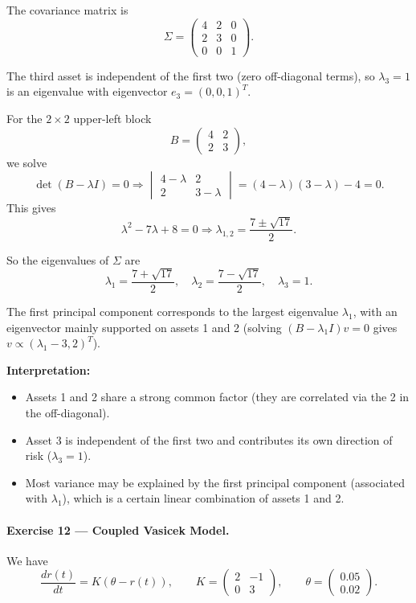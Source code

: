 \documentclass[11pt]{article}
\begin{document}
The covariance matrix is
\[
\Sigma=
\begin{pmatrix}
4 & 2 & 0\\
2 & 3 & 0\\
0 & 0 & 1
\end{pmatrix}.
\]

The third asset is independent of the first two (zero off-diagonal terms), so $\lambda_3=1$ is an eigenvalue with eigenvector $e_3=(0,0,1)^T$.

For the $2\times 2$ upper-left block
\[
B=
\begin{pmatrix}
4 & 2\\
2 & 3
\end{pmatrix},
\]
we solve
\[
\det(B-\lambda I)=0
\Rightarrow
\begin{vmatrix}
4-\lambda & 2\\
2 & 3-\lambda
\end{vmatrix}
= (4-\lambda)(3-\lambda)-4=0.
\]
This gives
\[
\lambda^2 -7\lambda+8=0
\Rightarrow
\lambda_{1,2} = \frac{7\pm\sqrt{17}}{2}.
\]

So the eigenvalues of $\Sigma$ are
\[
\lambda_1=\frac{7+\sqrt{17}}{2},\quad
\lambda_2=\frac{7-\sqrt{17}}{2},\quad
\lambda_3=1.
\]

The first principal component corresponds to the largest eigenvalue $\lambda_1$, with an eigenvector mainly supported on assets 1 and 2 (solving $(B-\lambda_1 I)v=0$ gives $v\propto(\lambda_1-3,2)^T$).  

\textbf{Interpretation:}
\begin{itemize}
\item Assets 1 and 2 share a strong common factor (they are correlated via the 2 in the off-diagonal).
\item Asset 3 is independent of the first two and contributes its own direction of risk ($\lambda_3=1$).
\item Most variance may be explained by the first principal component (associated with $\lambda_1$), which is a certain linear combination of assets 1 and 2.
\end{itemize}

\bigskip

\paragraph{Exercise 12 — Coupled Vasicek Model.}

We have
\[
\frac{dr(t)}{dt}=K(\theta-r(t)),
\qquad
K=
\begin{pmatrix}
2 & -1\\
0 & 3
\end{pmatrix},
\qquad
\theta=
\begin{pmatrix}
0.05\\
0.02
\end{pmatrix}.
\]
\end{document}
